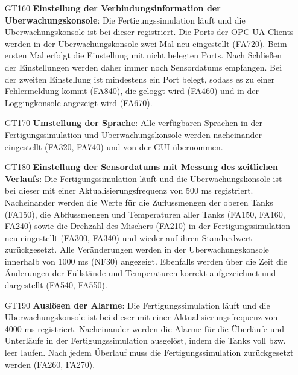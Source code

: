 \documentclass[parskip=full]{scrartcl}
\begin{document}
\begin{enumerate}
   alten Ports eingestellte \gls{Uberwachungskonsole} erhält zunächst keine \glspl{Sensordatum} mehr. Nach Einstellung der \gls{Uberwachungskonsole} auf die neuen Ports (FA710, FA810, FA820) und leeren Eingaben für die Ports der \glspl{OPC UA Client}, die somit automatisch bezogen werden (FA730), werden die \glspl{Sensordatum} wieder abgerufen (FA830).
  \item[GT160] \textbf{Einstellung der \gls{Verbindungsinformation} der \gls{Uberwachungskonsole}}: Die \gls{Fertigungssimulation} läuft und die \gls{Uberwachungskonsole} ist bei dieser registriert. Die Ports der 
   \glspl{OPC UA Client} werden in der \gls{Uberwachungskonsole} zwei Mal neu eingestellt (FA720). Beim ersten Mal erfolgt die Einstellung mit nicht belegten Ports. Nach Schließen der Einstellungen werden daher immer noch \glspl{Sensordatum} empfangen. Bei der zweiten Einstellung ist mindestens ein Port belegt, sodass es zu einer Fehlermeldung kommt (FA840), die geloggt wird (FA460) und in der Loggingkonsole angezeigt wird (FA670).
  \item[GT170] \textbf{Umstellung der Sprache}: Alle verfügbaren Sprachen in der \gls{Fertigungssimulation} und \gls{Uberwachungskonsole} werden nacheinander eingestellt (FA320, FA740) und von der \gls{GUI} übernommen.
  \item[GT180] \textbf{Einstellung der \glspl{Sensordatum} mit Messung des zeitlichen Verlaufs}: Die \gls{Fertigungssimulation} läuft und die \gls{Uberwachungskonsole} ist bei dieser mit einer
   Aktualisierungsfrequenz von 500 ms registriert. Nacheinander werden die Werte für die Zuflussmengen der oberen Tanks (FA150), die Abflussmengen und
   Temperaturen aller Tanks (FA150, FA160, FA240) sowie die Drehzahl des Mischers (FA210) in der \gls{Fertigungssimulation} neu eingestellt (FA300, FA340) und wieder auf ihren Standardwert zurückgesetzt.
   Alle Veränderungen werden in der \gls{Uberwachungskonsole} innerhalb von 1000 ms (NF30) angezeigt. Ebenfalls werden über die Zeit die Änderungen der Füllstände und
   Temperaturen korrekt aufgezeichnet und dargestellt (FA540, FA550).     
  \item[GT190] \textbf{Auslösen der Alarme}: Die \gls{Fertigungssimulation} läuft und die \gls{Uberwachungskonsole} ist bei dieser mit einer Aktualisierungsfrequenz von 4000 ms registriert.
   Nacheinander werden die Alarme für die Überläufe und Unterläufe in der \gls{Fertigungssimulation} ausgelöst, indem die Tanks voll bzw. leer laufen. Nach jedem Überlauf muss die \gls{Fertigungssimulation} zurückgesetzt werden (FA260, FA270).

\end{enumerate}
\end{document}
